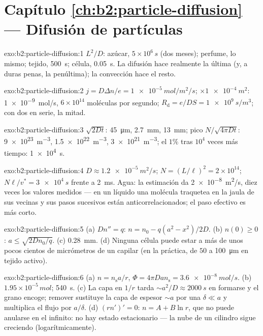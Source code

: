 \section*{Capítulo \ref{ch:b2:particle-diffusion} --- Difusión de partículas}

\begin{solution}{exo:b2:particle-diffusion:1}
$L^2/D$: azúcar, $5 \times 10^6\,\unit{s}$ (dos meses); perfume, lo mismo;
tejido, \qty{500}{s}; célula, \qty{0.05}{s}. La difusión hace realmente la última
(y, a duras penas, la penúltima); la convección hace el resto.
\end{solution}

\begin{solution}{exo:b2:particle-diffusion:2}
$j = D\Delta n/e = \qty{1e-5}{mol/m^2/s}$; $\times \qty{1e-4}{m^2}$:
\qty{1e-9}{mol/s}, $6 \times 10^{14}$ moléculas por segundo;
$R_{\text{d}} = e/DS = \qty{1e9}{s/m^3}$; con dos en serie, la mitad.
\end{solution}

\begin{solution}{exo:b2:particle-diffusion:3}
$\sqrt{2Dt}$: \qty{45}{\micro m}, \qty{2.7}{mm}, \qty{13}{mm}; pico $N/\sqrt{4\pi
Dt}$: \qty{9e23}{m^{-3}}, \qty{1.5e22}{m^{-3}}, \qty{3e21}{m^{-3}}; el $1\%$
tras $10^4$ veces más tiempo: \qty{1e4}{s}.
\end{solution}

\begin{solution}{exo:b2:particle-diffusion:4}
$D \approx \qty{1.2e-5}{m^2/s}$; $N = (L/\ell)^2 = 2 \times 10^{14}$; $N\ell/v^*
= \qty{3e4}{s}$ frente a \qty{2}{ms}. Agua: la estimación da
\qty{2e-8}{m^2/s}, diez veces los valores medidos --- en un líquido una
molécula traquetea en la jaula de sus vecinas y sus pasos sucesivos
están anticorrelacionados; el paso efectivo es más corto.
\end{solution}

\begin{solution}{exo:b2:particle-diffusion:5}
(a) $Dn'' = q$: $n = n_0 - q(a^2 - x^2)/2D$. (b) $n(0) \ge 0$: $a \le
\sqrt{2Dn_0/q}$. (c) \qty{0.28}{mm}. (d) Ninguna célula puede estar a más de unos
pocos cientos de micrómetros de un capilar (en la práctica, de $50$ a \qty{100}{\micro m}
en tejido activo).
\end{solution}

\begin{solution}{exo:b2:particle-diffusion:6}
(a) $n = n_{\text{s}}a/r$, $\Phi = 4\pi D a n_{\text{s}} = \qty{3.6e-8}{mol/s}$.
(b) $1.95 \times 10^{-5}\,\unit{mol}$; \qty{540}{s}. (c) La capa en $1/r$ tarda
$\sim a^2/D \approx \qty{2000}{s}$ en formarse y el grano encoge; remover
sustituye la capa de espesor $\sim a$ por una  $\delta \ll a$
y multiplica el flujo por $a/\delta$. (d) $(rn')' = 0$: $n = A + B\ln r$,
que no puede anularse en el infinito: no hay estado estacionario --- la nube de un
cilindro sigue creciendo (logarítmicamente).
\end{solution}


